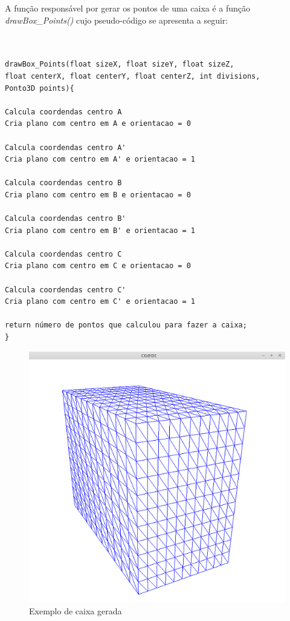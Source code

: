 \newpage


A função responsável por gerar os pontos de uma caixa é a função \textit{drawBox\_Points()} cujo pseudo-código se apresenta a seguir:

\begin{Verbatim}


drawBox_Points(float sizeX, float sizeY, float sizeZ, 
float centerX, float centerY, float centerZ, int divisions, 
Ponto3D points){

Calcula coordendas centro A
Cria plano com centro em A e orientacao = 0

Calcula coordendas centro A'
Cria plano com centro em A' e orientacao = 1

Calcula coordendas centro B
Cria plano com centro em B e orientacao = 0

Calcula coordendas centro B'
Cria plano com centro em B' e orientacao = 1

Calcula coordendas centro C
Cria plano com centro em C e orientacao = 0

Calcula coordendas centro C'
Cria plano com centro em C' e orientacao = 1

return número de pontos que calculou para fazer a caixa;
}

\end{Verbatim}

\begin{figure}[htpb]
	\centering
	\includegraphics[scale=0.5]{imagens/p3_caixa_10.png}
	\caption{Exemplo de caixa gerada}
	\label{p1:fig:p3_caixa_6_3_4}
\end{figure}

